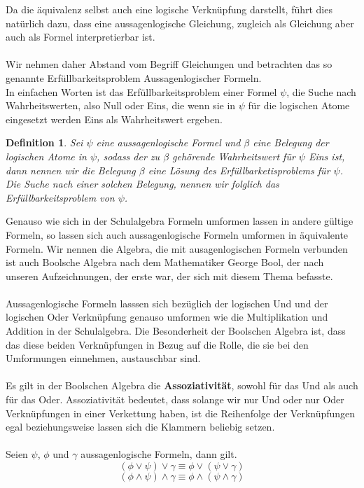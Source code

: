 \documentclass[11pt,a4paper,leqno]{report}
\newtheorem{definition}[theorem]{Definition}
\numberwithin{equation}{chapter}
\begin{document}
Da die \"aquivalenz selbst auch eine logische Verkn\"upfung darstellt, f\"uhrt dies nat\"urlich dazu, dass eine aussagenlogische Gleichung, zugleich als Gleichung aber auch als Formel interpretierbar ist.\\
\\
Wir nehmen daher Abstand vom Begriff Gleichungen und betrachten das so genannte Erf\"ullbarkeitsproblem Aussagenlogischer Formeln.\\
In einfachen Worten ist das Erf\"ullbarkeitsproblem einer Formel $\psi$, die Suche nach Wahrheitswerten, also Null oder Eins, die wenn sie in $\psi$ f\"ur die logischen Atome eingesetzt werden Eins als Wahrheitswert ergeben.
\begin{definition}
	Sei $\psi$ eine aussagenlogische Formel und $\beta$ eine Belegung der logischen Atome in $\psi$, sodass der zu $\beta$ geh\"orende Wahrheitswert f\"ur $\psi$ Eins ist, dann nennen wir die Belegung $\beta$ eine L\"osung des Erf\"ullbarketisproblems f\"ur $\psi$. Die Suche nach einer solchen Belegung, nennen wir folglich das Erf\"ullbarkeitsproblem von $\psi$.
\end{definition}
Genauso wie sich in der Schulalgebra Formeln umformen lassen in andere g\"ultige Formeln, so lassen sich auch aussagenlogische Formeln umformen in \"aquivalente Formeln. Wir nennen die Algebra, die mit ausagenlogischen Formeln verbunden ist auch Boolsche Algebra nach dem Mathematiker George Bool, der nach unseren Aufzeichnungen, der erste war, der sich mit diesem Thema befasste.\\
\\
Aussagenlogische Formeln lasssen sich bez\"uglich der logischen Und und der logischen Oder Verkn\"upfung genauso umformen wie die Multiplikation und Addition in der Schulalgebra. Die Besonderheit der Boolschen Algebra ist, dass das diese beiden Verkn\"upfungen in Bezug auf die Rolle, die sie bei den Umformungen einnehmen, austauschbar sind.\\
\\
Es gilt in der Boolschen Algebra die \textbf{Assoziativit\"at}, sowohl f\"ur das Und als auch f\"ur das Oder. Assoziativit\"at bedeutet, dass solange wir nur Und oder nur Oder Verkn\"upfungen in einer Verkettung haben, ist die Reihenfolge der Verkn\"upfungen egal beziehungsweise lassen sich die Klammern beliebig setzen.\\
\\
Seien $\psi$, $\phi$ und $\gamma$ aussagenlogische Formeln, dann gilt.
\begin{equation}
	(\phi \vee \psi)\vee\gamma \equiv \phi \vee (\psi\vee\gamma)
\end{equation}
\begin{equation}
	(\phi \wedge \psi)\wedge\gamma \equiv \phi \wedge (\psi\wedge\gamma)
\end{equation}
\end{document}
